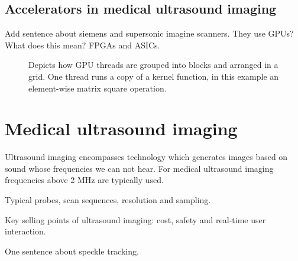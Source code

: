 \subsection{Accelerators in medical ultrasound imaging }
Add sentence about siemens and supersonic imagine scanners. They use GPUs? What does this mean? FPGAs and ASICs.

\begin{figure}
\centering
{}
\caption{Depicts how GPU threads are grouped into blocks and arranged in a grid. One thread runs a copy of a kernel function, in this example an element-wise matrix square operation.}
\label{fig:gpu_grid}
\end{figure}

\section {Medical ultrasound imaging}\label{sec:ultrasound}
Ultrasound imaging encompasses technology which generates images based on sound whose frequencies we can not hear. For medical ultrasound imaging frequencies above 2 MHz are typically used.

Typical probes, scan sequences, resolution and sampling.

Key selling points of ultrasound imaging: cost, safety and real-time user interaction.

One sentence about speckle tracking.

